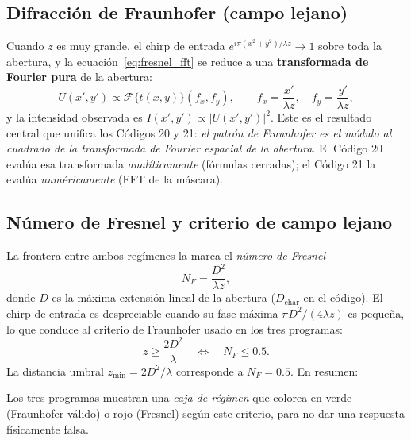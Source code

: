 \documentclass[11pt,a4paper]{article}
\newcommand{\Fou}{\mathcal{F}}
\begin{document}
\subsection{Difracción de Fraunhofer (campo lejano)}
Cuando $z$ es muy grande, el chirp de entrada $e^{i\pi(x^2+y^2)/\lambda z}\to 1$
sobre toda la abertura, y la ecuación~\eqref{eq:fresnel_fft} se reduce a una
\textbf{transformada de Fourier pura} de la abertura:
\begin{equation}
U(x',y') \propto \Fou\{t(x,y)\}(f_x,f_y),
\qquad f_x=\frac{x'}{\lambda z},\quad f_y=\frac{y'}{\lambda z},
\label{eq:fraunhofer}
\end{equation}
y la intensidad observada es $I(x',y')\propto |U(x',y')|^2$. Este es el resultado
central que unifica los Códigos 20 y 21: \emph{el patrón de Fraunhofer es el
módulo al cuadrado de la transformada de Fourier espacial de la abertura}. El
Código 20 evalúa esa transformada \emph{analíticamente} (fórmulas cerradas); el
Código 21 la evalúa \emph{numéricamente} (FFT de la máscara).

\subsection{Número de Fresnel y criterio de campo lejano}
La frontera entre ambos regímenes la marca el \emph{número de Fresnel}
\begin{equation}
N_F = \frac{D^2}{\lambda z},
\end{equation}
donde $D$ es la máxima extensión lineal de la abertura ($D_\text{char}$ en el
código). El chirp de entrada es despreciable cuando su fase máxima
$\pi D^2/(4\lambda z)$ es pequeña, lo que conduce al criterio de Fraunhofer usado
en los tres programas:
\begin{equation}
z \ge \frac{2D^2}{\lambda}
\quad\Longleftrightarrow\quad
N_F \le 0.5.
\label{eq:criterio}
\end{equation}
La distancia umbral $z_\text{min}=2D^2/\lambda$ corresponde a $N_F=0.5$. En
resumen:
\begin{center}
\end{center}
Los tres programas muestran una \emph{caja de régimen} que colorea en verde
(Fraunhofer válido) o rojo (Fresnel) según este criterio, para no dar una
respuesta físicamente falsa.
\end{document}
